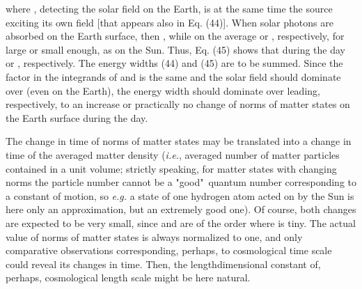 \documentclass[a4paper,12pt]{article}
\begin{document}
\ni where \coordHE{}, detecting the solar field \coordHE{} on the Earth, is at the same time the source exciting its own field \coordHE{} [that appears also in Eq. (44)]. When solar photons are ab\-sorbed on the Earth surface, then \coordHE{}, while on the average \coordHE{} or \coordHE{}, respectively, for \myHighlight{$\lambda$}\coordHE{} large or small enough, as \coordHE{} on the Sun. Thus, Eq. (45) shows that during the day \coordHE{} or \coordHE{}, respectively. The energy widths (44) and (45) are to be summed. Since the factor \coordHE{} in the integrands of \coordHE{} and \coordHE{} is the same and the solar field \coordHE{} should dominate over \coordHE{} (even on the Earth), the energy width \coordHE{} should dominate over \coordHE{} leading, respectively, to an increase or practically no change of norms of matter states on the Earth surface during the day.

The change in time of norms of matter states may be translated into a change in time of the averaged matter density ({\it i.e.}, averaged number of matter particles contained in a unit volume; strictly speaking, for matter states with changing norms the particle number cannot be a "good"\, quantum number corresponding to a constant of motion, so {\it e.g.} a state of one hydrogen atom acted on by the Sun is here only an approximation, but an extremely good one). Of course, both changes are expected to be very small, since \coordHE{} and \coordHE{} are of the order \coordHE{} where \coordHE{} is tiny. The actual value of norms of matter states is always normalized to one, and only comparative observations corresponding, perhaps, to cosmological time scale could reveal its changes in time. Then, the lengthdimensional constant \myHighlight{$\lambda $}\coordHE{} of, perhaps, cosmological length scale might be here natural.
\end{document}
